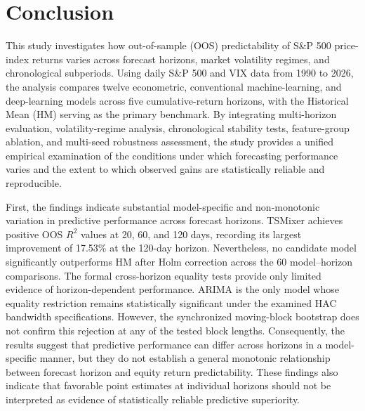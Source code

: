 \documentclass[runningheads,orivec]{llncs}
\begin{document}
\section{Conclusion}\label{sec:conclusion}

This study investigates how out-of-sample (OOS) predictability of S\&P 500 price-index returns varies across forecast horizons, market volatility regimes, and chronological subperiods. Using daily S\&P 500 and VIX data from 1990 to 2026, the analysis compares twelve econometric, conventional machine-learning, and deep-learning models across five cumulative-return horizons, with the Historical Mean (HM) serving as the primary benchmark. By integrating multi-horizon evaluation, volatility-regime analysis, chronological stability tests, feature-group ablation, and multi-seed robustness assessment, the study provides a unified empirical examination of the conditions under which forecasting performance varies and the extent to which observed gains are statistically reliable and reproducible.

First, the findings indicate substantial model-specific and non-monotonic variation in predictive performance across forecast horizons. TSMixer achieves positive OOS $R^2$ values at 20, 60, and 120 days, recording its largest improvement of 17.53\% at the 120-day horizon. Nevertheless, no candidate model significantly outperforms HM after Holm correction across the 60 model--horizon comparisons. The formal cross-horizon equality tests provide only limited evidence of horizon-dependent performance. ARIMA is the only model whose equality restriction remains statistically significant under the examined HAC bandwidth specifications. However, the synchronized moving-block bootstrap does not confirm this rejection at any of the tested block lengths. Consequently, the results suggest that predictive performance can differ across horizons in a model-specific manner, but they do not establish a general monotonic relationship between forecast horizon and equity return predictability. These findings also indicate that favorable point estimates at individual horizons should not be interpreted as evidence of statistically reliable predictive superiority.
\end{document}
